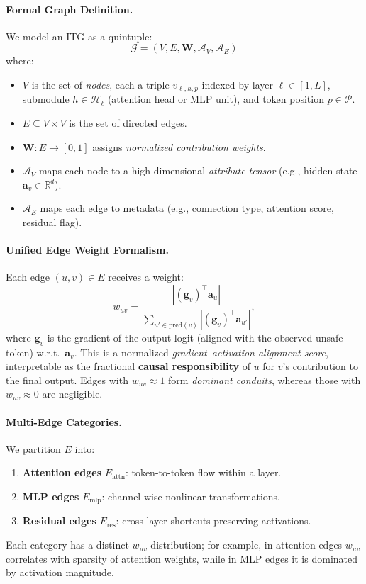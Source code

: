 \documentclass[11pt]{article}
\begin{document}
\paragraph{Formal Graph Definition.}
We model an ITG as a quintuple:
\[
\mathcal{G} = (V, E, \mathbf{W}, \mathcal{A}_V, \mathcal{A}_E)
\]
where:
\begin{itemize}
    \item $V$ is the set of \emph{nodes}, each a triple $v_{\ell,h,p}$ indexed by layer $\ell \in [1,L]$, submodule $h \in \mathcal{H}_\ell$ (attention head or MLP unit), and token position $p \in \mathcal{P}$.
    \item $E \subseteq V \times V$ is the set of directed edges.
    \item $\mathbf{W}: E \rightarrow [0,1]$ assigns \emph{normalized contribution weights}.
    \item $\mathcal{A}_V$ maps each node to a high-dimensional \emph{attribute tensor} (e.g., hidden state $\mathbf{a}_v \in \mathbb{R}^d$).
    \item $\mathcal{A}_E$ maps each edge to metadata (e.g., connection type, attention score, residual flag).
\end{itemize}

\paragraph{Unified Edge Weight Formalism.}
Each edge $(u,v) \in E$ receives a weight:
\[
w_{uv} = \frac{\left| \left( \mathbf{g}_v \right)^\top \mathbf{a}_u \right|}{\sum\limits_{u' \in \mathrm{pred}(v)} \left| \left( \mathbf{g}_v \right)^\top \mathbf{a}_{u'} \right|},
\]
where $\mathbf{g}_v$ is the gradient of the output logit (aligned with the observed unsafe token) w.r.t.\ $\mathbf{a}_v$.  
This is a normalized \emph{gradient–activation alignment score}, interpretable as the fractional \textbf{causal responsibility} of $u$ for $v$’s contribution to the final output.  
Edges with $w_{uv} \approx 1$ form \emph{dominant conduits}, whereas those with $w_{uv} \approx 0$ are negligible.

\paragraph{Multi-Edge Categories.}
We partition $E$ into:
\begin{enumerate}
    \item \textbf{Attention edges} $E_{\mathrm{attn}}$: token-to-token flow within a layer.
    \item \textbf{MLP edges} $E_{\mathrm{mlp}}$: channel-wise nonlinear transformations.
    \item \textbf{Residual edges} $E_{\mathrm{res}}$: cross-layer shortcuts preserving activations.
\end{enumerate}
Each category has a distinct $w_{uv}$ distribution; for example, in attention edges $w_{uv}$ correlates with sparsity of attention weights, while in MLP edges it is dominated by activation magnitude.
\end{document}
